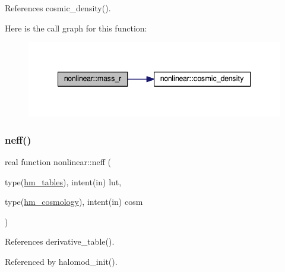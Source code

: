 References cosmic\+\_\+density().

Here is the call graph for this function\+:
\nopagebreak
\begin{figure}[H]
\begin{center}
\leavevmode
\includegraphics[width=340pt]{namespacenonlinear_a164bc94a32486b7a39cab9d1d3ddbafb_cgraph}
\end{center}
\end{figure}
\mbox{\label{namespacenonlinear_a94503cd59bd5a206379a0c13afe89ffc}} 
\subsubsection{\texorpdfstring{neff()}{neff()}}
{\footnotesize\ttfamily real function nonlinear\+::neff (\begin{DoxyParamCaption}\item[{type(\mbox{\hyperlink{structnonlinear_1_1hm__tables}{hm\+\_\+tables}}), intent(in)}]{lut,  }\item[{type(\mbox{\hyperlink{structnonlinear_1_1hm__cosmology}{hm\+\_\+cosmology}}), intent(in)}]{cosm }\end{DoxyParamCaption})\hspace{0.3cm}{\ttfamily [private]}}



References derivative\+\_\+table().



Referenced by halomod\+\_\+init().

